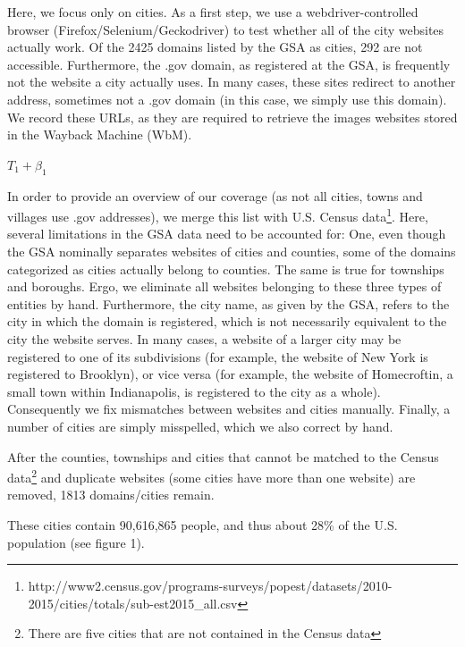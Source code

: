 \documentclass[11pt]{article}
\begin{document}
Here, we focus only on cities. As a first step, we use a webdriver-controlled browser (Firefox/Selenium/Geckodriver) to test whether all of the city websites actually work. Of the 2425 domains listed by the GSA as cities, 292 are not accessible. Furthermore, the .gov domain, as registered at the GSA, is frequently not the website a city actually uses. In many cases, these sites redirect to another address, sometimes not a .gov domain (in this case, we simply use this domain). We record these URLs, as they are required to retrieve the images websites stored in the Wayback Machine (WbM).

$T_{1}+\beta_1$

In order to provide an overview of our coverage (as not all cities, towns and villages use .gov addresses), we merge this list with U.S. Census data\footnote{http://www2.census.gov/programs-surveys/popest/datasets/2010-2015/cities/totals/sub-est2015\_all.csv}. Here, several limitations in the GSA data need to be accounted for: One, even though the GSA nominally separates websites of cities and counties, some of the domains categorized as cities actually belong to counties. The same is true for townships and boroughs. Ergo, we eliminate all websites belonging to these three types of entities by hand. Furthermore, the city name, as given by the GSA, refers to the city in which the domain is registered, which is not necessarily equivalent to the city the website serves. In many cases, a website of a larger city may be registered to one of its subdivisions (for example, the website of New York is registered to Brooklyn), or vice versa (for example, the website of Homecroftin, a small town within Indianapolis, is registered to the city as a whole). Consequently we fix mismatches between websites and cities manually. Finally, a number of cities are simply misspelled, which we also correct by hand.

After the counties, townships and cities that cannot be matched to the Census data\footnote{There are five cities that are not contained in the Census data} and duplicate websites (some cities have more than one website) are removed, 1813 domains/cities remain.

These cities contain 90,616,865 people, and thus about 28\% of the U.S. population (see figure 1).
\end{document}
